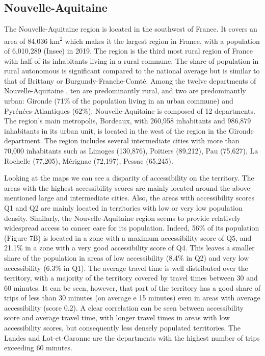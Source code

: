 \subsection*{Nouvelle-Aquitaine}

The Nouvelle-Aquitaine region is located in the southwest of France. It covers
an area of 84,036 km\textsuperscript{2} which makes it the largest region in
France, with a population of 6,010,289 (Insee) in 2019. The region is the third
most rural region of France with half of its inhabitants living in a rural
commune. The share of population in rural autonomous is significant compared to
the national average but is similar to that of Brittany or
Burgundy-Franche-Comté. Among the twelve departments of Nouvelle-Aquitaine , ten
are predominantly rural, and two are predominantly urban: Gironde (71\% of the
population living in an urban commune) and Pyrénées-Atlantiques (62\%).
Nouvelle-Aquitaine is composed of 12 departments. The region's main metropolis,
Bordeaux, with 260,958 inhabitants and 986,879 inhabitants in its urban unit, is
located in the west of the region in the Gironde department. The region includes
several intermediate cities with more than 70,000 inhabitants such as Limoges
(130,876), Poitiers (89,212), Pau (75,627), La Rochelle (77,205), Mérignac
(72,197), Pessac (65,245).

Looking at the maps we can see a disparity of accessibility on the territory.
The areas with the highest accessibility scores are mainly located around the
above-mentioned large and intermediate cities. Also, the areas with
accessibility scores Q1 and Q2 are mainly located in territories with low or
very low population density. Similarly, the Nouvelle-Aquitaine region seems to
provide relatively widespread access to cancer care for its population. Indeed,
56\% of its population (Figure 7B) is located in a zone with a maximum
accessibility score of Q5, and 21.1\% in a zone with a very good accessibility
score of Q4. This leaves a smaller share of the population in areas of low
accessibility (8.4\% in Q2) and very low accessibility (6.3\% in Q1). The
average travel time is well distributed over the territory, with a majority of
the territory covered by travel times between 30 and 60 minutes. It can be seen,
however, that part of the territory has a good share of trips of less than 30
minutes (on average e 15 minutes) even in areas with average accessibility
(score 0.2). A clear correlation can be seen between accessibility score and
average travel time, with longer travel times in areas with low accessibility
scores, but consequently less densely populated territories. The Landes and
Lot-et-Garonne are the departments with the highest number of trips exceeding 60
minutes.

